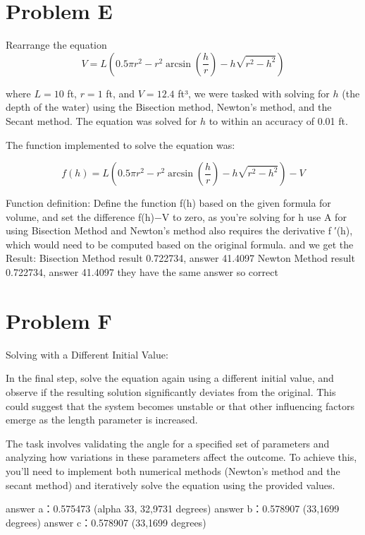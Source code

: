 \documentclass{article}
\begin{document}
\section*{Problem E}

Rearrange the equation
\[
V = L \left( 0.5\pi r^2 - r^2 \arcsin \left( \frac{h}{r} \right) - h \sqrt{r^2 - h^2} \right)
\]

where \( L = 10 \) ft, \( r = 1 \) ft, and \( V = 12.4 \) ft³, we were tasked with solving for \( h \) (the depth of the water) using the Bisection method, Newton's method, and the Secant method. The equation was solved for \( h \) to within an accuracy of 0.01 ft.

The function implemented to solve the equation was:

\[
f(h) = L \left( 0.5\pi r^2 - r^2 \arcsin \left( \frac{h}{r} \right) - h \sqrt{r^2 - h^2} \right) - V
\]

Function definition: Define the function 
f(h) based on the given formula for volume, and set the difference f(h)−V to zero, as you're solving for h use A for 
 using Bisection Method and Newton's method also requires the derivative f ′(h), which would need to be computed based on the original formula.
and we get the Result: 
Bisection Method result 0.722734, answer 41.4097
Newton Method result 0.722734, answer 41.4097
they have the same answer so correct


\section*{Problem F}

Solving with a Different Initial Value:

In the final step, solve the equation again using a different initial value, and observe if the resulting solution significantly deviates from the original. This could suggest that the system becomes unstable or that other influencing factors emerge as the length parameter is increased.

The task involves validating the angle for a specified set of parameters and analyzing how variations in these parameters affect the outcome. To achieve this, you'll need to implement both numerical methods (Newton’s method and the secant method) and iteratively solve the equation using the provided values.

answer a：0.575473 (alpha 33, 32,9731 degrees)
answer b：0.578907 (33,1699 degrees)
answer c：0.578907 (33,1699 degrees)
\end{document}
